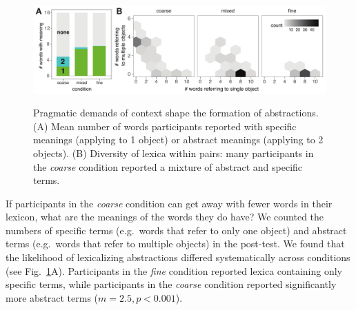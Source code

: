 \documentclass[10pt,letterpaper]{article}
\begin{document}
\begin{figure}[t]
\begin{center}
{\includegraphics[scale=0.67]{resultsFig_v1.pdf}}
{\caption{{Pragmatic demands of context shape the formation of abstractions. (A) Mean number of words participants reported with specific meanings (applying to 1 object) or abstract meanings (applying to 2 objects).
(B) Diversity of lexica within pairs: many participants in the \emph{coarse} condition reported a mixture of abstract and specific terms.%
\label{fig:lexiconContent}}}}
\end{center}
\vspace{-2ex}
\end{figure}

If participants in the \emph{coarse} condition can get away with fewer words in their lexicon, what are the meanings of the words they do have? We counted the numbers of specific terms (e.g.\ words that refer to only one object) and abstract terms (e.g.\ words that refer to multiple objects) in the post-test. We found that the likelihood of lexicalizing abstractions differed systematically across conditions (see Fig.\ \ref{fig:lexiconContent}A). Participants in the \emph{fine} condition reported lexica containing only specific terms, while participants in the \emph{coarse} condition reported significantly more abstract terms ($m = 2.5, p < 0.001$). 
\end{document}
